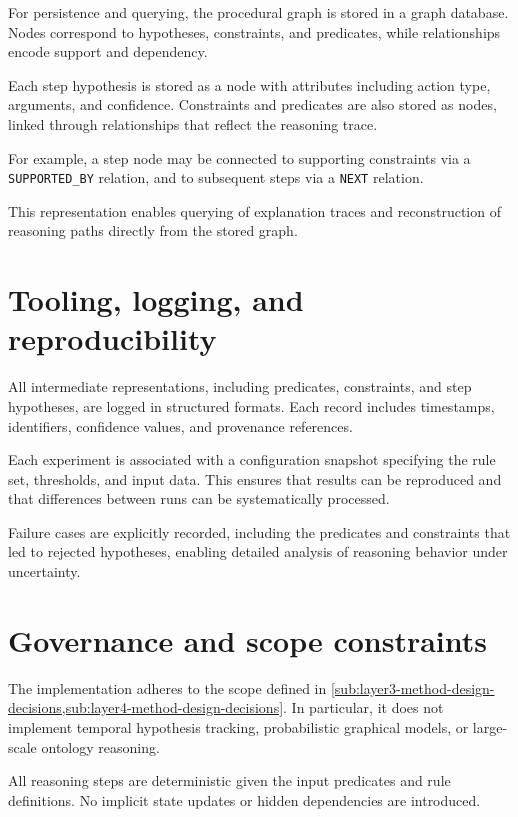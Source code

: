 \documentclass[11pt,titlepage,openright]{book}
\begin{document}
For persistence and querying, the procedural graph is stored in a graph database. Nodes correspond to hypotheses, constraints, and predicates, while relationships encode support and dependency.

Each step hypothesis is stored as a node with attributes including action type, arguments, and confidence. Constraints and predicates are also stored as nodes, linked through relationships that reflect the reasoning trace.

For example, a step node may be connected to supporting constraints via a \texttt{SUPPORTED\_BY} relation, and to subsequent steps via a \texttt{NEXT} relation.

This representation enables querying of explanation traces and reconstruction of reasoning paths directly from the stored graph.

\section{Tooling, logging, and reproducibility}

All intermediate representations, including predicates, constraints, and step hypotheses, are logged in structured formats. Each record includes timestamps, identifiers, confidence values, and provenance references.

Each experiment is associated with a configuration snapshot specifying the rule set, thresholds, and input data. This ensures that results can be reproduced and that differences between runs can be systematically processed.

Failure cases are explicitly recorded, including the predicates and constraints that led to rejected hypotheses, enabling detailed analysis of reasoning behavior under uncertainty.

\section{Governance and scope constraints}

The implementation adheres to the scope defined in \cref{sub:layer3-method-design-decisions,sub:layer4-method-design-decisions}. In particular, it does not implement temporal hypothesis tracking, probabilistic graphical models, or large-scale ontology reasoning.

All reasoning steps are deterministic given the input predicates and rule definitions. No implicit state updates or hidden dependencies are introduced.
\end{document}
